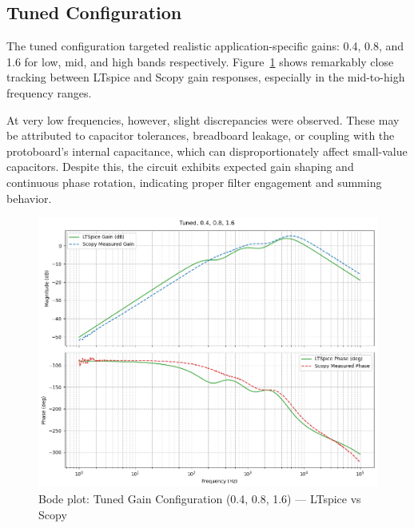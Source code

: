 \documentclass[12pt]{article}
\begin{document}
\subsection{Tuned Configuration}

The tuned configuration targeted realistic application-specific gains: 0.4, 0.8, and 1.6 for low, mid, and high bands respectively. Figure~\ref{fig:tunedvalue} shows remarkably close tracking between LTspice and Scopy gain responses, especially in the mid-to-high frequency ranges.

At very low frequencies, however, slight discrepancies were observed. These may be attributed to capacitor tolerances, breadboard leakage, or coupling with the protoboard’s internal capacitance, which can disproportionately affect small-value capacitors. Despite this, the circuit exhibits expected gain shaping and continuous phase rotation, indicating proper filter engagement and summing behavior.

\begin{figure}[H]
	\centering
	\includegraphics[width=\textwidth]{dp2tuned.png}
	\caption{Bode plot: Tuned Gain Configuration (0.4, 0.8, 1.6) — LTspice vs Scopy}
	\label{fig:tunedvalue}
\end{figure}
\end{document}
